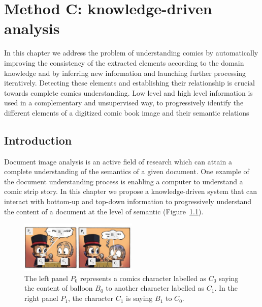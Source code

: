 \chapter{Method C: knowledge-driven analysis}
\label{chap:knowledge}
\graphicspath{{./chapters/5-knowledge/figs/}}

In this chapter we address the problem of understanding comics by automatically improving the consistency of the extracted elements according to the domain knowledge and by inferring new information and launching further processing iteratively.
Detecting these elements and establishing their relationship is crucial towards complete comics understanding.
Low level and high level information is used in a complementary and unsupervised way, to progressively identify the different elements of a digitized comic book image and their semantic relations


\section{Introduction}
\label{sec:kn:introduction}


Document image analysis is an active field of research which can attain a complete understanding of the semantics of a given document.
One example of the document understanding process is enabling a computer to understand a comic strip story.
In this chapter we propose a knowledge-driven system that can interact with bottom-up and top-down information to progressively understand the content of a document at the level of semantic (Figure~\ref{fig:kn:intro_illustration}).

 \begin{figure}[ht]  %
   \centering
  \includegraphics[trim= 0px 10px 3px 10px, clip, width=0.5\textwidth]{intro_illustration.pdf}
  \caption{The left panel $P_0$ represents a comics character labelled as $C_0$ saying the content of balloon $B_0$ to another character labelled as $C_1$. In the right panel $P_1$, the character $C_1$ is saying $B_1$ to $C_0$.}
  \label{fig:kn:intro_illustration}
 \end{figure}


